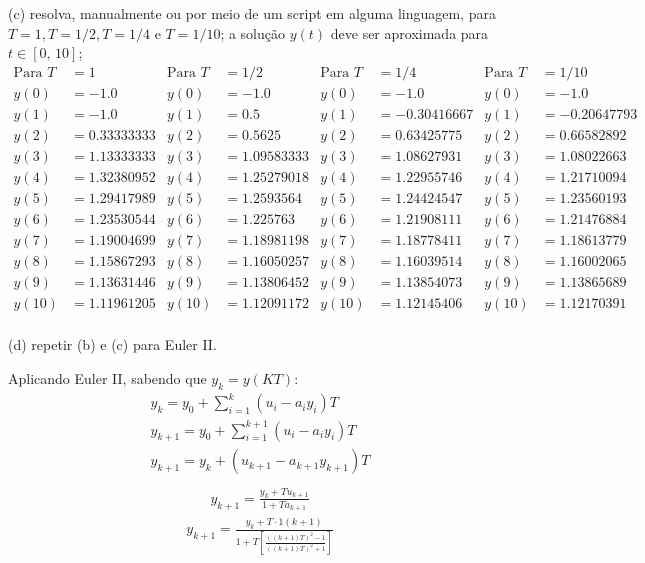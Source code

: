 \documentclass[10pt]{article}
\begin{document}
(c) resolva, manualmente ou por meio de um script em alguma linguagem, para $T = 1, T = 1/2, T = 1/4$ e $T = 1/10$; a solução $y(t)$ deve ser aproximada para $t \in [0, \, 10]$;
\begin{align*}
    \text{Para } T &= 1  & \text{Para } T &= 1/2   &  \text{Para } T &= 1/4       & \text{Para } T &= 1/10\\
    y(0) &= -1.0        & y(0)  &= -1.0        &  y(0) &= -1.0             &  y(0) &= -1.0\\
    y(1) &= -1.0        & y(1)  &= 0.5         &  y(1) &= -0.30416667      &  y(1) &= -0.20647793\\
    y(2) &= 0.33333333  & y(2)  &= 0.5625      &  y(2) &= 0.63425775       &  y(2) &= 0.66582892\\
    y(3) &= 1.13333333  & y(3)  &= 1.09583333  &  y(3) &= 1.08627931       &  y(3) &= 1.08022663\\
    y(4) &= 1.32380952  & y(4)  &= 1.25279018  &  y(4) &= 1.22955746       &  y(4) &= 1.21710094\\
    y(5) &= 1.29417989  & y(5)  &= 1.2593564   &  y(5) &= 1.24424547       &  y(5) &= 1.23560193\\
    y(6) &= 1.23530544  & y(6)  &= 1.225763    &  y(6) &= 1.21908111       &  y(6) &= 1.21476884\\
    y(7) &= 1.19004699  & y(7)  &= 1.18981198  &  y(7) &= 1.18778411       &  y(7) &= 1.18613779\\
    y(8) &= 1.15867293  & y(8)  &= 1.16050257  &  y(8) &= 1.16039514       &  y(8) &= 1.16002065\\
    y(9) &= 1.13631446  & y(9)  &= 1.13806452  &  y(9) &= 1.13854073       &  y(9) &= 1.13865689\\
    y(10) &= 1.11961205 & y(10) &= 1.12091172  &  y(10) &= 1.12145406      &  y(10) &= 1.12170391\\
\end{align*}

(d) repetir (b) e (c) para Euler II.

Aplicando Euler II, sabendo que $ y_k = y(KT) $:
\begin{align*}
    y_k = y_0 + \sum_{i=1}^{k} (u_i - a_i y_i)T\\
    y_{k+1} = y_0 + \sum_{i=1}^{k+1} (u_i - a_i y_i)T\\
    y_{k+1} = y_k + (u_{k+1} - a_{k+1} y_{k+1})T\\
\end{align*}
\begin{align*}
    y_{k+1} = \frac{y_k + Tu_{k+1}}{1 + Ta_{k+1}}
\end{align*}
\begin{align*}
    y_{k+1} = \frac{y_k + T \cdot 1(k+1)}{1 + T \left[\frac{((k+1)T)^2-1}{((k+1)T)^2+1} \right]}
\end{align*}
\end{document}
